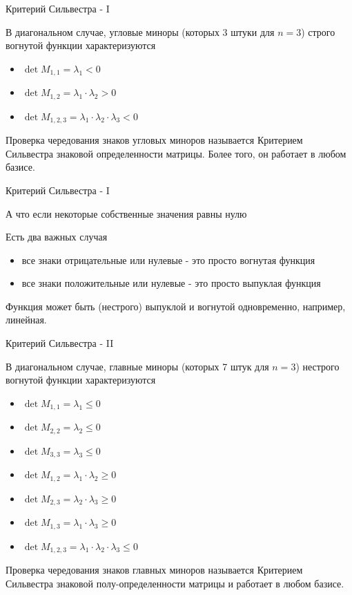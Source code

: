 \documentclass{beamer}
\begin{document}
\begin{frame}{Критерий Сильвестра - I}

В диагональном случае, угловые миноры (которых 3 штуки для $n = 3$) строго вогнутой функции характеризуются

\begin{itemize}
  \item $\det M_{1,1} = \lambda_1 < 0$
  \item $\det M_{1,2} = \lambda_1 \cdot \lambda_2 > 0$
  \item $\det M_{1,2,3} = \lambda_1 \cdot \lambda_2 \cdot \lambda_3 < 0$
\end{itemize}

Проверка чередования знаков угловых миноров называется \alert{Критерием Сильвестра знаковой определенности матрицы}. Более того, он работает в любом базисе.

\end{frame}

\begin{frame}{Критерий Сильвестра - I}

А что если некоторые собственные значения равны нулю

Есть два важных случая

\begin{itemize}
  \item все знаки отрицательные или нулевые - это просто \alert{вогнутая} функция
  \item все знаки положительные или нулевые - это просто \alert{выпуклая} функция
\end{itemize}

Функция может быть (нестрого) выпуклой и вогнутой одновременно, например, линейная.

\end{frame}

\begin{frame}{Критерий Сильвестра - II}

В диагональном случае, главные миноры (которых 7 штук для $n = 3$) нестрого вогнутой функции характеризуются

\begin{itemize}
  \item $\det M_{1,1} = \lambda_1 \leqslant 0$
  \item $\det M_{2,2} = \lambda_2 \leqslant 0$
  \item $\det M_{3,3} = \lambda_3 \leqslant 0$
  \item $\det M_{1,2} = \lambda_1 \cdot \lambda_2 \geqslant 0$
  \item $\det M_{2,3} = \lambda_2 \cdot \lambda_3 \geqslant 0$
  \item $\det M_{1,3} = \lambda_1 \cdot \lambda_3 \geqslant 0$
  \item $\det M_{1,2,3} = \lambda_1 \cdot \lambda_2 \cdot \lambda_3 \leqslant 0$
\end{itemize}

Проверка чередования знаков главных миноров называется \alert{Критерием Сильвестра знаковой полу-определенности матрицы} и работает в любом базисе.

\end{frame}
\end{document}
